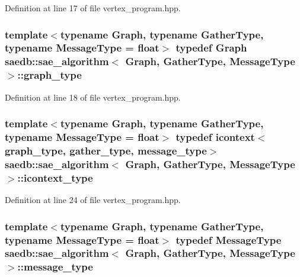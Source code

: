 Definition at line 17 of file vertex\-\_\-program.\-hpp.

\hypertarget{classsaedb_1_1sae__algorithm_a87749c5b779e21642c2928b746556540}{
\subsubsection[{graph\-\_\-type}]{\setlength{\rightskip}{0pt plus 5cm}template$<$typename Graph, typename Gather\-Type, typename Message\-Type = float$>$ typedef Graph {\bf saedb\-::sae\-\_\-algorithm}$<$ Graph, Gather\-Type, Message\-Type $>$\-::{\bf graph\-\_\-type}}}\label{d0/d9f/classsaedb_1_1sae__algorithm_a87749c5b779e21642c2928b746556540}


Definition at line 18 of file vertex\-\_\-program.\-hpp.

\hypertarget{classsaedb_1_1sae__algorithm_a190f07adbc04f0188ad09b50dbe93a33}{
\subsubsection[{icontext\-\_\-type}]{\setlength{\rightskip}{0pt plus 5cm}template$<$typename Graph, typename Gather\-Type, typename Message\-Type = float$>$ typedef {\bf icontext}$<${\bf graph\-\_\-type}, {\bf gather\-\_\-type}, {\bf message\-\_\-type}$>$ {\bf saedb\-::sae\-\_\-algorithm}$<$ Graph, Gather\-Type, Message\-Type $>$\-::{\bf icontext\-\_\-type}}}\label{d0/d9f/classsaedb_1_1sae__algorithm_a190f07adbc04f0188ad09b50dbe93a33}


Definition at line 24 of file vertex\-\_\-program.\-hpp.

\hypertarget{classsaedb_1_1sae__algorithm_a757eb6dffc652f91f2c10a24f6596156}{
\subsubsection[{message\-\_\-type}]{\setlength{\rightskip}{0pt plus 5cm}template$<$typename Graph, typename Gather\-Type, typename Message\-Type = float$>$ typedef Message\-Type {\bf saedb\-::sae\-\_\-algorithm}$<$ Graph, Gather\-Type, Message\-Type $>$\-::{\bf message\-\_\-type}}}\label{d0/d9f/classsaedb_1_1sae__algorithm_a757eb6dffc652f91f2c10a24f6596156}


